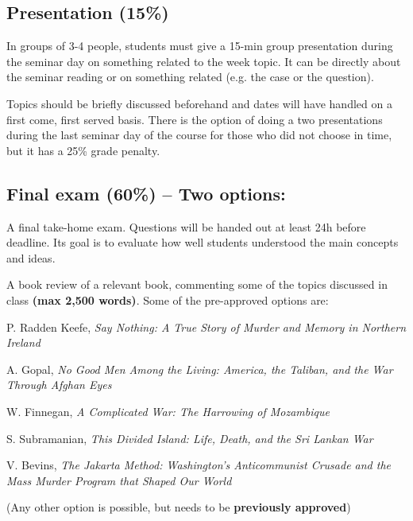 \documentclass[12pt, a4paper]{article}
\begin{document}
\subsection*{Presentation (15\%)}

In groups of 3-4 people, students must give a 15-min group presentation during the seminar day on something related to the week topic. It can be directly about the seminar reading or on something related (e.g. the case or the question).

Topics should be briefly discussed beforehand and dates will have handled on a first come, first served basis. There is the option of doing a two presentations during the last seminar day of the course for those who did not choose in time, but it has a 25\% grade penalty.

\subsection*{Final exam (60\%) -- Two options:}

\begin{itemize}
  \item[\textbf{A.}] A final take-home exam. Questions will be handed out at least 24h before deadline. Its goal is to evaluate how well students understood the main concepts and ideas.
  \item[\textbf{B.}] A book review of a relevant book, commenting some of the topics discussed in class \textbf{(max 2,500 words)}. Some of the pre-approved options are:
  {\small
  \item[-] P. Radden Keefe, \textit{Say Nothing: A True Story of Murder and Memory in Northern Ireland} \vspace{-10pt}
  \item[-] A. Gopal, \textit{No Good Men Among the Living: America, the Taliban, and the War Through Afghan Eyes} \vspace{-10pt}
  \item[-] W. Finnegan, \textit{A Complicated War: The Harrowing of Mozambique} \vspace{-10pt}
  \item[-] S. Subramanian, \textit{This Divided Island: Life, Death, and the Sri Lankan War} \vspace{-10pt}
  \item[-] V. Bevins, \textit{The Jakarta Method: Washington's Anticommunist Crusade and the Mass Murder Program that Shaped Our World}
  }
  \item[] (Any other option is possible, but needs to be \textbf{previously approved})
\end{itemize}
\end{document}
